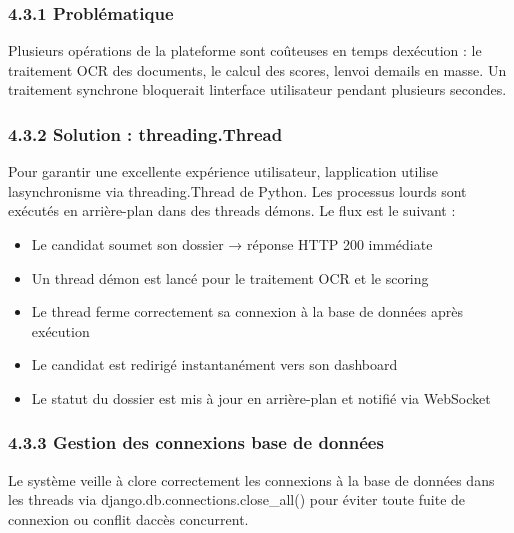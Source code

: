 \documentclass[
]{article}
\begin{document}
\hypertarget{probluxe9matique}{%
\subsubsection{4.3.1 Problématique}\label{probluxe9matique}}

Plusieurs opérations de la plateforme sont coûteuses en temps
d\textquotesingle exécution : le traitement OCR des documents, le calcul
des scores, l\textquotesingle envoi d\textquotesingle emails en masse.
Un traitement synchrone bloquerait l\textquotesingle interface
utilisateur pendant plusieurs secondes.

\hypertarget{solution-threading.thread}{%
\subsubsection{4.3.2 Solution :
threading.Thread}\label{solution-threading.thread}}

Pour garantir une excellente expérience utilisateur,
l\textquotesingle application utilise l\textquotesingle asynchronisme
via threading.Thread de Python. Les processus lourds sont exécutés en
arrière-plan dans des threads démons. Le flux est le suivant :

\begin{itemize}
\item
  Le candidat soumet son dossier → réponse HTTP 200 immédiate
\item
  Un thread démon est lancé pour le traitement OCR et le scoring
\item
  Le thread ferme correctement sa connexion à la base de données après
  exécution
\item
  Le candidat est redirigé instantanément vers son dashboard
\item
  Le statut du dossier est mis à jour en arrière-plan et notifié via
  WebSocket
\end{itemize}

\hypertarget{gestion-des-connexions-base-de-donnuxe9es}{%
\subsubsection{4.3.3 Gestion des connexions base de
données}\label{gestion-des-connexions-base-de-donnuxe9es}}

Le système veille à clore correctement les connexions à la base de
données dans les threads via django.db.connections.close\_all() pour
éviter toute fuite de connexion ou conflit d\textquotesingle accès
concurrent.
\end{document}
